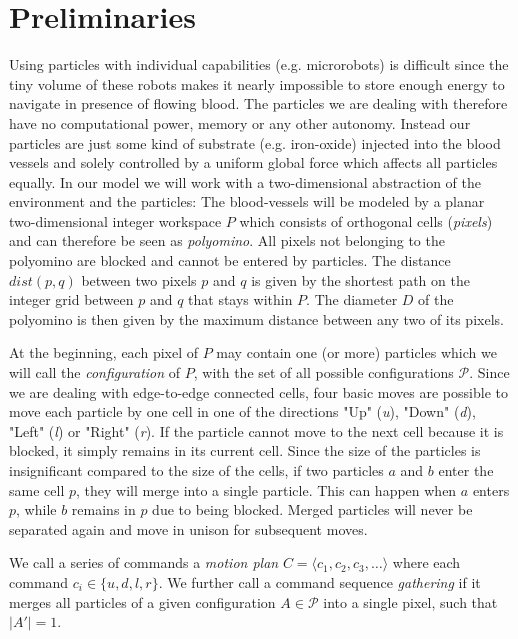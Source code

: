 \section{Preliminaries} \label{sec:TDDPreliminaries}
Using particles with individual capabilities (e.g. microrobots) is difficult since the tiny volume of these robots makes it nearly impossible to store enough energy to navigate in presence of flowing blood. The particles we are dealing with therefore have no computational power, memory or any other autonomy. Instead our particles are just some kind of substrate (e.g. iron-oxide) injected into the blood vessels and solely controlled by a uniform global force which affects all particles equally. In our model we will work with a two-dimensional abstraction of the environment and the particles: The blood-vessels will be modeled by a planar two-dimensional integer workspace $P$ which consists of orthogonal cells (\textit{pixels}) and can therefore be seen as \textit{polyomino}. All pixels not belonging to the polyomino are blocked and cannot be entered by particles. The distance $dist(p, q)$ between two pixels $p$ and $q$ is given by the shortest path on the integer grid between $p$ and $q$ that stays within $P$. The diameter $D$ of the polyomino is then given by the maximum distance between any two of its pixels. 

At the beginning, each pixel of $P$ may contain one (or more) particles which we will call the \textit{configuration} of $P$, with the set of all possible configurations $\mathcal{P}$. Since we are dealing with edge-to-edge connected cells, four basic moves are possible to move each particle by one cell in one of the directions "Up" (\textit{u}), "Down" (\textit{d}), "Left" (\textit{l}) or "Right" (\textit{r}). If the particle cannot move to the next cell because it is blocked, it simply remains in its current cell. Since the size of the particles is insignificant compared to the size of the cells, if two particles $a$ and $b$ enter the same cell $p$, they will merge into a single particle. This can happen when $a$ enters $p$, while $b$ remains in $p$ due to being blocked. Merged particles will never be separated again and move in unison for subsequent moves.

We call a series of commands a \textit{motion plan} $C = \langle c_1, c_2, c_3, \dots \rangle$ where each command $c_i \in \{u, d, l, r\}$. We further call a command sequence \textit{gathering} if it merges all particles of a given configuration $A \in \mathcal{P}$ into a single pixel, such that $|A'| = 1$.


